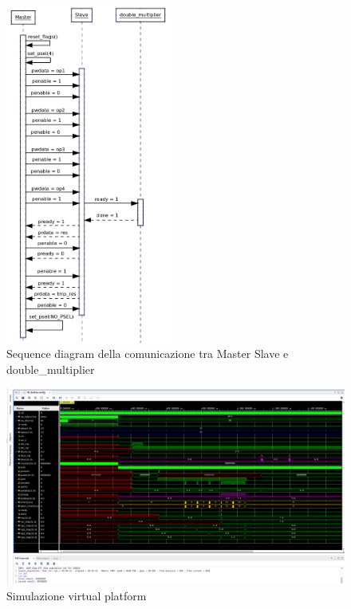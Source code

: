\documentclass[]{IEEEtran}
\begin{document}
\begin{figure}[bt]
    \centering
    \includegraphics[width=0.5\textwidth]{figures/seq_diagram.png}
    \caption{Sequence diagram della comunicazione tra Master Slave e double\_multiplier}
    \label{fig:SEQ_DIAGRAM}
\end{figure}

\begin{figure}[bt]
    \centering
    \includegraphics[width=\textwidth]{figures/SIM_VP.png}
    \caption{Simulazione virtual platform}
    \label{fig:SIM_VP}
\end{figure}
\end{document}
